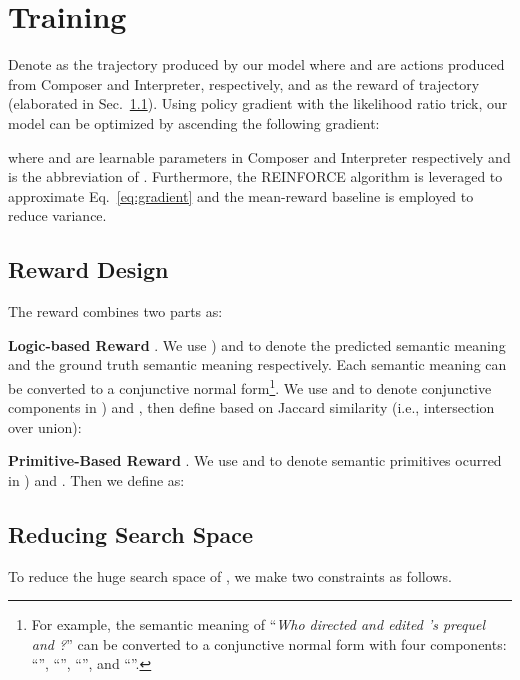 \documentclass[11pt,a4paper]{article}
\begin{document}
\section{Training}




Denote  as the trajectory produced by our model where  and  are actions produced from  Composer and Interpreter, respectively, and  as the reward of trajectory  (elaborated in Sec.~\ref{sec:reward}).
Using policy gradient \cite{policy_gradient_1999} with the likelihood ratio trick, our model can be optimized by ascending the following gradient:

where  and  are learnable parameters in Composer and Interpreter respectively and  is the abbreviation of . 
Furthermore, the REINFORCE algorithm \cite{reinforce_algo_1992} is leveraged to approximate Eq.~\ref{eq:gradient} and the mean-reward baseline \cite{reinforce_baseline_2001} is employed to reduce variance.















\subsection{Reward Design}\label{sec:reward}
The reward  combines two parts as:



\noindent \textbf{Logic-based Reward} .
We use ) and  to denote the predicted semantic meaning and the ground truth semantic meaning respectively.
Each semantic meaning can be converted to a conjunctive normal form\footnote{
For example, the semantic meaning of ``\emph{Who directed and edited  's prequel and ?}'' can be converted to a conjunctive normal form with four components:
``'',
``'',
``'', and
``''.}.
We use  and  to denote conjunctive components in ) and , then define  based on Jaccard similarity (i.e., intersection over union):


\noindent \textbf{Primitive-Based Reward} .
We use  and  to denote semantic primitives ocurred in ) and .
Then we define  as:


\subsection{Reducing Search Space}
To reduce the huge search space of , we make two constraints as follows.
\end{document}
